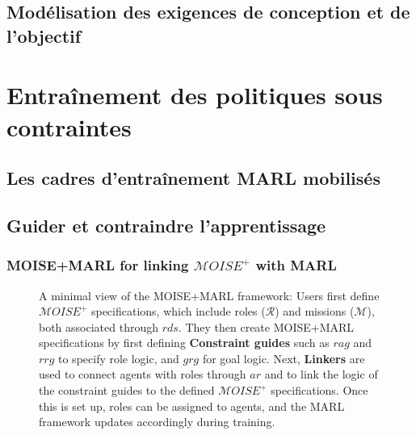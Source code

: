 \section{Modélisation des exigences de conception et de l'objectif}

\chapter{Entraînement des politiques sous contraintes}
\section{Les cadres d'entraînement MARL mobilisés}
\section{Guider et contraindre l'apprentissage}


\subsection{MOISE+MARL for linking $\mathcal{M}OISE^+$ with MARL}

\begin{figure}[h!]
    \centering
    
    \caption{A minimal view of the MOISE+MARL framework:
        Users first define $\mathcal{M}OISE^+$ specifications, which include roles ($\mathcal{R}$) and missions ($\mathcal{M}$), both associated through $rds$. They then create MOISE+MARL specifications by first defining \textbf{Constraint guides} such as $rag$ and $rrg$ to specify role logic, and $grg$ for goal logic. 
        Next, \textbf{Linkers} are used to connect agents with roles through $ar$ and to link the logic of the constraint guides to the defined $\mathcal{M}OISE^+$ specifications. Once this is set up, roles can be assigned to agents, and the MARL framework updates accordingly during training.
    }
    \label{fig:mm_synthesis}
\end{figure}

